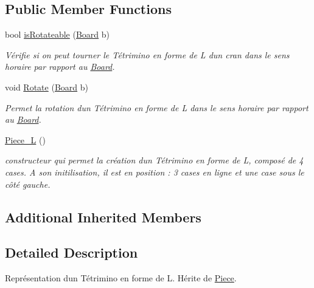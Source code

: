 \subsection*{Public Member Functions}
\begin{DoxyCompactItemize}
\item 
bool \hyperlink{classPiece__L_a34954ce32a27bdadb4d56ca7f3d82cba}{is\+Rotateable} (\hyperlink{classBoard}{Board} b)
\begin{DoxyCompactList}\small\item\em Vérifie si on peut tourner le Tétrimino en forme de L d\textquotesingle{}un cran dans le sens horaire par rapport au \hyperlink{classBoard}{Board}. \end{DoxyCompactList}\item 
void \hyperlink{classPiece__L_aa865e9d2c6c468ac2921d6adb88f4d1b}{Rotate} (\hyperlink{classBoard}{Board} b)
\begin{DoxyCompactList}\small\item\em Permet la rotation d\textquotesingle{}un Tétrimino en forme de L dans le sens horaire par rapport au \hyperlink{classBoard}{Board}. \end{DoxyCompactList}\item 
\mbox{\label{classPiece__L_a2cd2017561857128dfc8838fc90e3e0b}} 
\hyperlink{classPiece__L_a2cd2017561857128dfc8838fc90e3e0b}{Piece\+\_\+L} ()
\begin{DoxyCompactList}\small\item\em constructeur qui permet la création d\textquotesingle{}un Tétrimino en forme de L, composé de 4 cases. A son initilisation, il est en position \+: 3 cases en ligne et une case sous le côté gauche. \end{DoxyCompactList}\end{DoxyCompactItemize}
\subsection*{Additional Inherited Members}


\subsection{Detailed Description}
Représentation d\textquotesingle{}un Tétrimino en forme de L. Hérite de \hyperlink{classPiece}{Piece}. 

